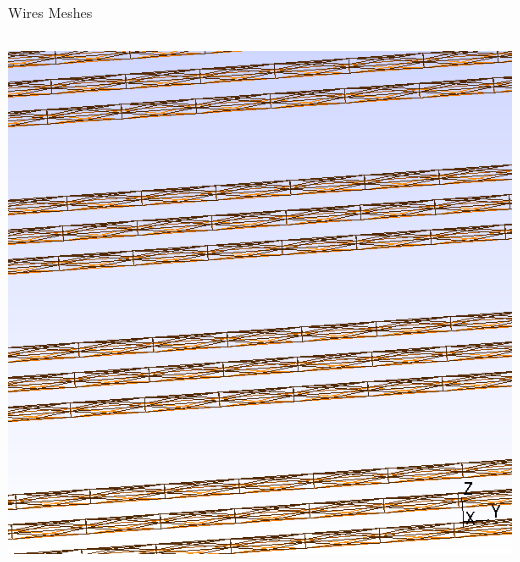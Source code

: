 \documentclass[xcolor=dvipsnames]{beamer}
\begin{document}
\begin{frame}{Wires Meshes}

  \footnotesize

  \begin{columns}
    \begin{column}{0.3\textwidth}
      \begin{center}
        \includegraphics[height=0.4\textheight]{parallel-mesh.png}      
        

\end{center}
\end{column}
\end{columns}
\end{frame}
\end{document}
